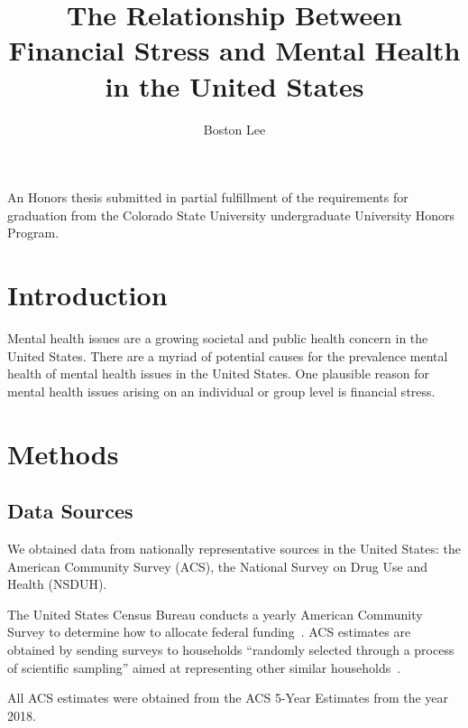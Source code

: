 \documentclass{article}
\title{The Relationship Between Financial Stress and Mental Health in the United States}
\author{Boston Lee}
\begin{document}
\maketitle

\vfill
\begin{center}
\begin{minipage}{30em}
\begin{center}
An Honors thesis submitted in partial fulfillment of the requirements for
graduation from the Colorado State University undergraduate University Honors
Program.
\end{center}
\end{minipage}
\end{center}
\vfill

\pagebreak

\tableofcontents

\pagebreak

\section{Introduction}

Mental health issues are a growing societal and public health concern
in the United States.
There are a myriad of potential causes for the prevalence mental health
of mental health issues in the United States.
One plausible reason for mental health issues arising
on an individual or group level
is financial stress.

\section{Methods}

\subsection{Data Sources}

We obtained data from nationally representative sources
in the United States:
the American Community Survey (ACS),
the National Survey on Drug Use and Health (NSDUH).

The United States Census Bureau
conducts a yearly American Community Survey
to determine how to allocate federal
funding~\cite{acs_description}.
ACS estimates are obtained by
sending surveys to households
``randomly selected through a process of scientific sampling''
aimed at representing other similar households~\cite{acs_sampling}.


All ACS estimates were obtained from
the ACS 5-Year Estimates from the year 2018.
\end{document}
